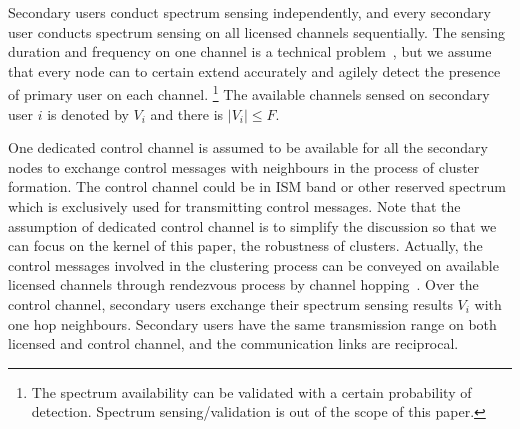 \documentclass[10pt,journal,compsoc]{IEEEtran}
\theoremstyle{mytheoremstyle}
\theoremstyle{mytheoremstyle}
\theoremstyle{mytheoremstyle}
\begin{document}
Secondary users conduct spectrum sensing independently, and every secondary user conducts spectrum sensing on all licensed channels sequentially.
The sensing duration and frequency on one channel is a technical problem~\cite{sensing_survey_2009}, but we assume that every node can to certain extend accurately and agilely detect the presence of primary user on each channel. \footnote{The spectrum availability can be validated with a certain probability of detection. Spectrum sensing/validation is out of the scope of this paper.}
The available channels sensed on secondary user $i$ is denoted by $V_i$ and there is $\vert V_i \vert \leq F$. %


One dedicated control channel is assumed to be available for all the secondary nodes to exchange control messages with neighbours in the process of cluster formation.
The control channel could be in ISM band or other reserved spectrum which is exclusively used for transmitting control messages.
Note that the assumption of dedicated control channel is to simplify the discussion so that we can focus on the kernel of this paper, the robustness of clusters.
Actually, the control messages involved in the clustering process can be conveyed on available licensed channels through rendezvous process by channel hopping~\cite{channelHopping_Rendezvous_2014, Gu_distributed_rendezvous_2014}. 
Over the control channel, secondary users exchange their spectrum sensing results $V_{i}$ with one hop neighbours. 
Secondary users have the same transmission range on both licensed and control channel, and the communication links are reciprocal.



\end{document}
